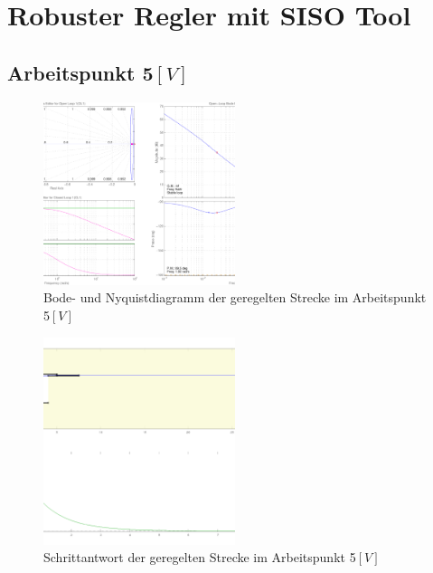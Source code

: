 \section{Robuster Regler mit SISO Tool}

\subsection{Arbeitspunkt 5$\si{[V]}$}
\begin{figure}[h!]
    \centering
    \includegraphics[width=0.5\textwidth]{10/siso_diagramms_g5.pdf}
    \caption{Bode- und Nyquistdiagramm der geregelten Strecke im Arbeitspunkt 5$\si{[V]}$}
    \label{fig:10_diag_5}
\end{figure}
\begin{figure}[h!]
    \centering
    \includegraphics[width=0.5\textwidth]{10/siso_step_g5.pdf}
    \caption{Schrittantwort der geregelten Strecke im Arbeitspunkt 5$\si{[V]}$}
    \label{fig:10_step_5}
\end{figure}

